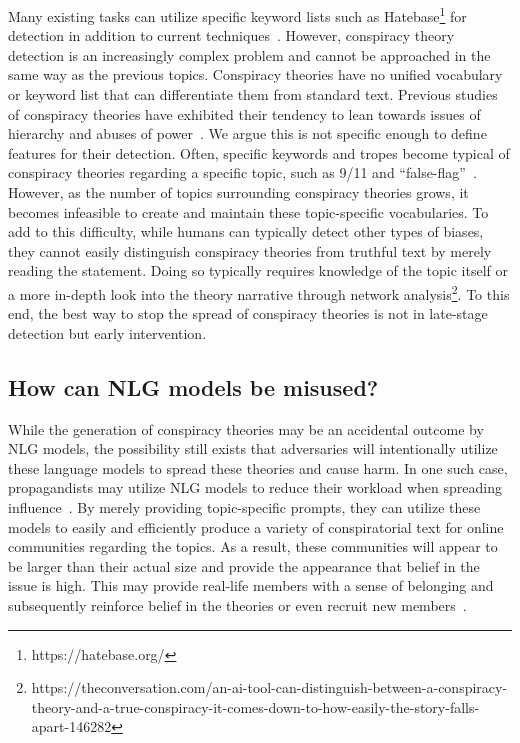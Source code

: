 \documentclass[11pt,a4paper]{article}
\begin{document}
Many existing tasks can utilize specific keyword lists such as Hatebase\footnote{https://hatebase.org/} for detection in addition to current techniques~\cite{sun2019mitigating}. However, conspiracy theory detection is an increasingly complex problem and cannot be approached in the same way as the previous topics. Conspiracy theories have no unified vocabulary or keyword list that can differentiate them from standard text. Previous studies of conspiracy theories have exhibited their tendency to lean towards issues of hierarchy and abuses of power~\cite{klein2019pathways}. We argue this is not specific enough to define features for their detection. Often, specific keywords and tropes become typical of conspiracy theories regarding a specific topic, such as 9/11 and ``false-flag''~\cite{knight2008outrageous}. However, as the number of topics surrounding conspiracy theories grows, it becomes infeasible to create and maintain these topic-specific vocabularies. To add to this difficulty, while humans can typically detect other types of biases, they cannot easily distinguish conspiracy theories from truthful text by merely reading the statement. Doing so typically requires knowledge of the topic itself or a more in-depth look into the theory narrative through network analysis\footnote{https://theconversation.com/an-ai-tool-can-distinguish-between-a-conspiracy-theory-and-a-true-conspiracy-it-comes-down-to-how-easily-the-story-falls-apart-146282}. To this end, the best way to stop the spread of conspiracy theories is not in late-stage detection but early intervention.

\subsection{How can NLG models be misused?}
While the generation of conspiracy theories may be an accidental outcome by NLG models, the possibility still exists that adversaries will intentionally utilize these language models to spread these theories and cause harm. In one such case, propagandists may utilize NLG models to reduce their workload when spreading influence~\cite{mcguffie2020radicalization}. By merely providing topic-specific prompts, they can utilize these models to easily and efficiently produce a variety of conspiratorial text for online communities regarding the topics. As a result, these communities will appear to be larger than their actual size and provide the appearance that belief in the issue is high. This may provide real-life members with a sense of belonging and subsequently reinforce belief in the theories or even recruit new members~\cite{douglas2017psychology}.
\end{document}
